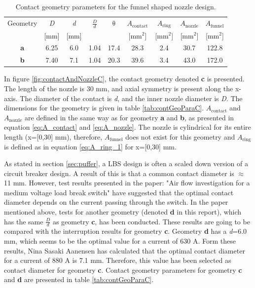 \documentclass[10pt,b5paper,twoside]{article}
\begin{document}
\begin{table}[H]
\center
\caption{Contact geometry parameters for the funnel shaped nozzle design.}
 \begin{tabular}{|c|c|c|c|c|c|c|c|c|}
\hline 
Geometry & \textit{D} & \textit{d}  & $\frac{D}{d}$ & $\mathrm{\theta}$ & $A_\mathrm{{contact}}$ & $A_\mathrm{{ring}}$  & $A_\mathrm{{nozzle}}$ & $A_\mathrm{{funnel}}$ \\
  & [mm] &  [mm] &   &   &   [mm$^2$] &  [mm$^2$] &   [mm$^2$] &   [mm$^2$]\\
\hline 
\textbf{a} & 6.25 & 6.0 & 1.04 & 17.4 & 28.3 & 2.4 & 30.7 & 122.8\\ 
\hline 
\textbf{b} & 7.40 & 7.1 & 1.04 & 20.3 & 39.6 & 3.4 & 43.0 & 172.0\\ 
\hline 
\end{tabular} 
\label{tab:contGeoPara}
\end{table}

In figure \ref{fig:contactAndNozzleC}, the contact geometry denoted \textbf{c} is presented. The length of the nozzle is 30 mm, and axial symmetry is present along the x-axis. The diameter of the contact is \textit{d}, and the inner nozzle diameter is \textit{D}. The dimensions for the geometry is given in table \ref{tab:contGeoParaC}. $A_\mathrm{{contact}}$ and $A_\mathrm{{nozzle}}$ are defined in the same way as for geometry \textbf{a} and \textbf{b}, as presented in equation \eqref{eq:A_contact} and \eqref{eq:A_nozzle}. The nozzle is cylindrical for its entire length (x=[0,30] mm), therefore, $A_\mathrm{{funnel}}$ does not exist for this geometry and $A_\mathrm{{ring}}$ is defined as in equation \eqref{eq:A_ring_1} for x=[0,30] mm. 

As stated in section \ref{sec:puffer}, a LBS design is often a scaled down version of a circuit breaker design. A result of this is that a common contact diameter is $\approx$ 11 mm. However, test results presented in the paper: "Air flow investigation for a medium voltage load break switch" \cite{bib:AFIMVLBA} have suggested that the optimal contact diameter depends on the current passing through the switch. In the paper mentioned above, tests for another geometry (denoted \textbf{d} in this report), which has the same $\frac{D}{d}$ as geometry \textbf{c}, has been conducted. These results are going to be compared with the interruption results for geometry \textbf{c}. Geometry \textbf{d} has a \textit{d}=6.0 mm, which seems to be the optimal value for a current of 630 A. Form these results, Nina Sasaki Aanensen has calculated that the optimal contact diameter for a current of 880 A is 7.1 mm. Therefore, this value has been selected as contact diameter for geometry \textbf{c}. Contact geometry parameters for geometry \textbf{c} and \textbf{d} are presented in table \ref{tab:contGeoParaC}.
\end{document}
